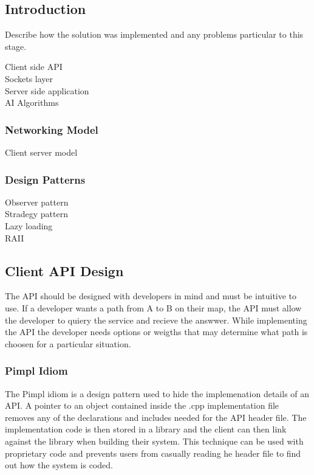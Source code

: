 \documentclass[12pt,a4paper,titlepage]{article}
\begin{document}
\subsection{Introduction}

Describe how the solution was implemented and any problems particular to this stage.

Client side API\\
Sockets layer\\
Server side application\\
AI Algorithms\\

\subsubsection{Networking Model}

Client server model\\

\subsubsection{Design Patterns}
Observer pattern\\
Stradegy pattern\\
Lazy loading\\
RAII\\

\subsection{Client API Design}

The API should be designed with developers in mind and must be intuitive to use. If a developer wants a path from A to B on their map, the API must allow the developer to quiery the service and recieve the answwer. While implementing the API the developer needs options or weigths that may determine what path is choosen for a particular situation. 

\subsubsection{Pimpl Idiom}

The Pimpl idiom is a design pattern used to hide the implemenation details of an API. A pointer to an object contained inside the .cpp implementation file removes any of the declarations and includes needed for the API header file. The implementation code is then stored in a library and the client can then link against the library when building their system. This technique can be used with proprietary code and prevents users from casually reading he header file to find out how the system is coded. 
\end{document}

